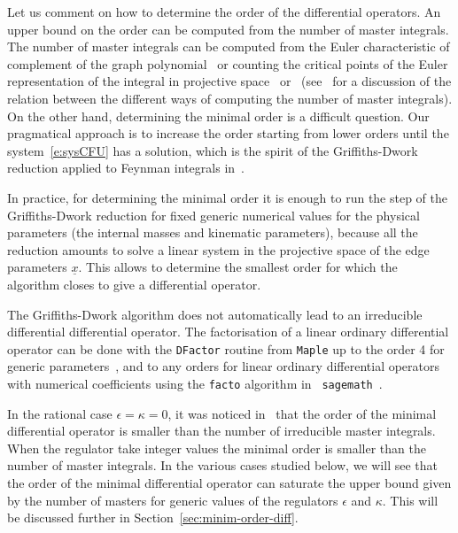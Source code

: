 \documentclass[a4paper,12pt]{article}
\numberwithin{equation}{section}
\numberwithin{figure}{section}
\begin{document}
\medskip
 
 Let us comment on how to determine the order of the differential operators. An upper bound on the order can be computed
 from the number of master integrals.
 The number of master
integrals  can be computed from the Euler
characteristic of complement of the graph polynomial~\cite{Bitoun:2017nre} or counting the
critical points of the Euler representation of the integral in
projective
space~\cite{Lee:2013hzt,Cacciatori:2021nli}
or~\cite{Mastrolia:2018uzb,Frellesvig:2019uqt} (see~\cite{Agostini:2022cgv} for
a discussion of the relation between the different ways of computing the number of master
integrals). On the other hand, determining the minimal order is a
difficult question. Our pragmatical approach is to increase the order
starting from 
lower orders until the system~\eqref{e:sysCFU} has a solution, which is
the spirit of the Griffiths-Dwork reduction applied to Feynman
integrals in~\cite{Muller-Stach:2011qkg}.

In practice, for determining the minimal order it is enough to run the step of the
Griffiths-Dwork reduction for fixed generic numerical values for the physical
parameters (the internal masses and kinematic
parameters), because all the reduction amounts to solve a linear system in the projective space of
the edge parameters $\underline x$. This allows to determine the smallest order for which the
algorithm closes to give a differential operator.

The Griffiths-Dwork algorithm does not automatically
lead to an irreducible differential differential operator.
The factorisation of a linear ordinary
differential operator can be done with the {\tt DFactor} routine from
{\tt Maple} up to the order 4 for generic parameters~\cite{PutSinger,vanHoeij}, and to any
orders for linear  ordinary
differential operators with numerical coefficients
using the {\tt facto} algorithm in {\tt
	sagemath}~\cite{chyzak2022symbolic,goyer2021sage}.


 In the rational case $\epsilon=\kappa=0$, it was noticed
in~\cite{Bloch:2013tra,Bloch:2016izu,Bloch:2014qca,Lairez:2022zkj} that the order of the minimal differential operator is
smaller than the number of irreducible master integrals.
When the regulator take integer values the minimal order is smaller
than the number of master integrals. 
In the various cases studied below,
we will see that the order of the minimal differential operator can saturate
the upper bound given by the number of masters for generic values of
the regulators  $\epsilon$  and $\kappa$. 
This will
      be discussed further in Section~\ref{sec:minim-order-diff}.
\end{document}
